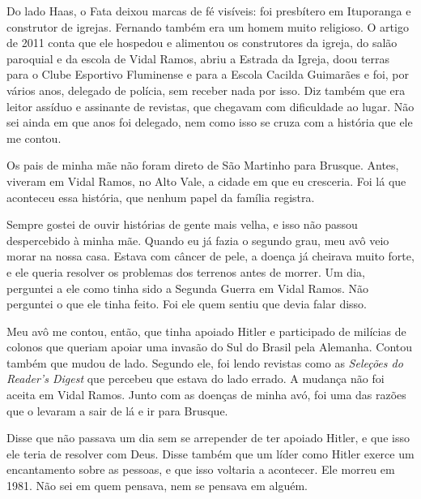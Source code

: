 \documentclass[
  brazilian,
  11pt,
  openany]{book}
\begin{document}
Do lado Haas, o Fata deixou marcas de fé visíveis: foi presbítero em
Ituporanga e construtor de igrejas. Fernando também era um homem muito
religioso. O artigo de 2011 conta que ele hospedou e alimentou os
construtores da igreja, do salão paroquial e da escola de Vidal Ramos,
abriu a Estrada da Igreja, doou terras para o Clube Esportivo Fluminense
e para a Escola Cacilda Guimarães e foi, por vários anos, delegado de
polícia, sem receber nada por isso. Diz também que era leitor assíduo e
assinante de revistas, que chegavam com dificuldade ao lugar. Não sei
ainda em que anos foi delegado, nem como isso se cruza com a história
que ele me contou.

Os pais de minha mãe não foram direto de São Martinho para Brusque.
Antes, viveram em Vidal Ramos, no Alto Vale, a cidade em que eu
cresceria. Foi lá que aconteceu essa história, que nenhum papel da
família registra.

Sempre gostei de ouvir histórias de gente mais velha, e isso não passou
despercebido à minha mãe. Quando eu já fazia o segundo grau, meu avô
veio morar na nossa casa. Estava com câncer de pele, a doença já
cheirava muito forte, e ele queria resolver os problemas dos terrenos
antes de morrer. Um dia, perguntei a ele como tinha sido a Segunda
Guerra em Vidal Ramos. Não perguntei o que ele tinha feito. Foi ele quem
sentiu que devia falar disso.

Meu avô me contou, então, que tinha apoiado Hitler e participado de
milícias de colonos que queriam apoiar uma invasão do Sul do Brasil pela
Alemanha. Contou também que mudou de lado. Segundo ele, foi lendo
revistas como as \emph{Seleções do Reader's Digest} que percebeu que
estava do lado errado. A mudança não foi aceita em Vidal Ramos. Junto
com as doenças de minha avó, foi uma das razões que o levaram a sair de
lá e ir para Brusque.

Disse que não passava um dia sem se arrepender de ter apoiado Hitler, e
que isso ele teria de resolver com Deus. Disse também que um líder como
Hitler exerce um encantamento sobre as pessoas, e que isso voltaria a
acontecer. Ele morreu em 1981. Não sei em quem pensava, nem se pensava
em alguém.
\end{document}

